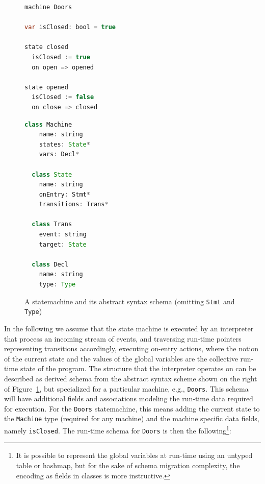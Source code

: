 \documentclass[english,submission]{programming}
\begin{document}
\begin{figure}[t]
\centering
\begin{minipage}[t]{0.4\textwidth}
\begin{lstlisting}[language=java,morekeywords={machine,on,state,var}]
machine Doors

var isClosed: bool = true

state closed
  isClosed := true
  on open => opened

state opened
  isClosed := false
  on close => closed
\end{lstlisting}
\end{minipage}
\hspace*{5pt}\vline
\begin{minipage}[t]{0.4\textwidth}
\begin{lstlisting}[language=java,morekeywords={on}]
  class Machine
    name: string
    states: State*
    vars: Decl*

  class State
    name: string
    onEntry: Stmt*
    transitions: Trans*

  class Trans
    event: string
    target: State

  class Decl
    name: string
    type: Type
  \end{lstlisting}
\end{minipage}
\caption{A statemachine and its abstract syntax schema (omitting \lstinline{Stmt} and \lstinline{Type})}
\label{LST:statemachines}
\end{figure}

In the following we assume that the state machine is executed by an interpreter that process an incoming stream of events, and traversing run-time pointers representing transitions accordingly, executing on-entry actions, where the notion of the current state and the values of the global variables are the collective run-time state of the program. The structure that the interpreter operates on can be described as derived  schema from the abstract syntax scheme shown on the right of Figure~\ref{LST:statemachines}, but specialized for a particular machine, e.g., \lstinline{Doors}.
This schema will have additional fields and associations modeling the run-time data required for execution. For the \lstinline{Doors} statemachine, this means adding the current state to the \lstinline{Machine} type (required for any machine) and the machine specific data fields, namely \lstinline{isClosed}. The run-time schema for \lstinline{Doors} is then the following\footnote{It is possible to represent the global variables at run-time using an untyped table or hashmap, but for the sake of schema migration complexity, the encoding as fields in classes is more instructive.}:
\end{document}
